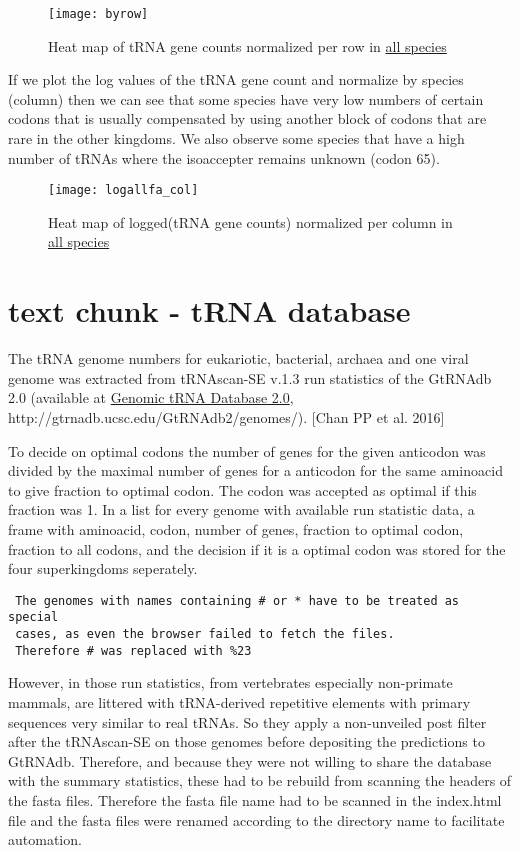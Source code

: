 \begin{figure}[tb] 
\centering 
\texttt{[image: byrow]} 
\caption[Heat map for tRNA counts]{Heat map of tRNA gene counts normalized per row in \hyperlink{data:veab}{all species}}
\label{fig:byrow} 
\end{figure}

If we plot the log values of the tRNA gene count and normalize by species (column) then we can see that some species have very low numbers of certain codons that is usually compensated by using another block of codons that are rare in the other kingdoms. We also observe some species that have a high number of tRNAs where the isoaccepter remains unknown (codon 65).


\begin{figure}[tb] 
\centering 
\texttt{[image: logallfa\_col]} 
\caption[Heat map for log(tRNA counts)]{Heat map of logged(tRNA gene counts) normalized per column in \hyperlink{data:veab}{all species}}
\label{fig:bycol} 
\end{figure}


\section{text chunk - tRNA database}
The tRNA genome numbers for eukariotic, bacterial, archaea and one viral genome was extracted from tRNAscan-SE v.1.3 run statistics of the GtRNAdb 2.0 (available at
\href{http://gtrnadb.ucsc.edu/GtRNAdb2/genomes/}{Genomic tRNA Database 2.0}, http://gtrnadb.ucsc.edu/GtRNAdb2/genomes/). \cite{Chan2016}[Chan PP et al. 2016]

To decide on optimal codons the number of genes for the given anticodon was divided by the maximal number of genes for a anticodon for the same aminoacid to give fraction to optimal codon. The codon was accepted as optimal if this fraction was 1. In a list for every genome with available run statistic data, a frame with aminoacid, codon, number of genes, fraction to optimal codon, fraction to all codons, and the decision if it is a optimal codon was stored for the four superkingdoms seperately.
 
\begin{verbatim}
 The genomes with names containing # or * have to be treated as special 
 cases, as even the browser failed to fetch the files. 
 Therefore # was replaced with %23
\end{verbatim}

However, in those run statistics, from vertebrates especially non-primate mammals, are littered with tRNA-derived repetitive elements with primary sequences very similar to real tRNAs. So they apply a non-unveiled post filter after the tRNAscan-SE on those genomes before depositing the predictions to GtRNAdb. Therefore, and because they were not willing to share the database with the summary statistics, these had to be rebuild from scanning the headers of the fasta files. Therefore the fasta file name had to be scanned in the index.html file and the fasta files were renamed according to the directory name to facilitate automation. 


